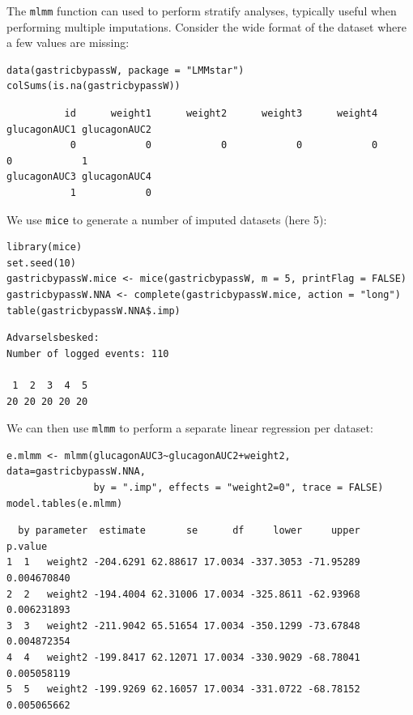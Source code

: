 \documentclass[12pt]{article}
\begin{document}
The \texttt{mlmm} function can used to perform stratify analyses, typically
useful when performing multiple imputations. Consider the wide format
of the dataset where a few values are missing:
\lstset{language=r,label= ,caption= ,captionpos=b,numbers=none}
\begin{lstlisting}
data(gastricbypassW, package = "LMMstar")
colSums(is.na(gastricbypassW))
\end{lstlisting}

\begin{verbatim}
          id      weight1      weight2      weight3      weight4 glucagonAUC1 glucagonAUC2 
           0            0            0            0            0            0            1 
glucagonAUC3 glucagonAUC4 
           1            0
\end{verbatim}


We use \texttt{mice} to generate a number of imputed datasets (here 5):
\lstset{language=r,label= ,caption= ,captionpos=b,numbers=none}
\begin{lstlisting}
library(mice)
set.seed(10)
gastricbypassW.mice <- mice(gastricbypassW, m = 5, printFlag = FALSE)
gastricbypassW.NNA <- complete(gastricbypassW.mice, action = "long")
table(gastricbypassW.NNA$.imp)
\end{lstlisting}

\begin{verbatim}
Advarselsbesked:
Number of logged events: 110

 1  2  3  4  5 
20 20 20 20 20
\end{verbatim}


We can then use \texttt{mlmm} to perform a separate linear regression per dataset:
\lstset{language=r,label= ,caption= ,captionpos=b,numbers=none}
\begin{lstlisting}
e.mlmm <- mlmm(glucagonAUC3~glucagonAUC2+weight2, data=gastricbypassW.NNA,
               by = ".imp", effects = "weight2=0", trace = FALSE)
model.tables(e.mlmm)
\end{lstlisting}

\begin{verbatim}
  by parameter  estimate       se      df     lower     upper     p.value
1  1   weight2 -204.6291 62.88617 17.0034 -337.3053 -71.95289 0.004670840
2  2   weight2 -194.4004 62.31006 17.0034 -325.8611 -62.93968 0.006231893
3  3   weight2 -211.9042 65.51654 17.0034 -350.1299 -73.67848 0.004872354
4  4   weight2 -199.8417 62.12071 17.0034 -330.9029 -68.78041 0.005058119
5  5   weight2 -199.9269 62.16057 17.0034 -331.0722 -68.78152 0.005065662
\end{verbatim}
\end{document}
